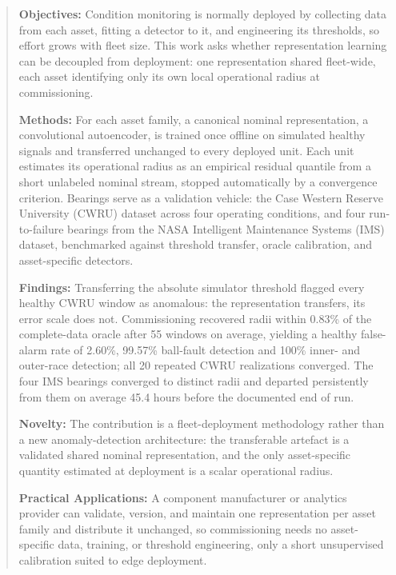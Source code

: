 \documentclass{trbunofficial}
\begin{document}
\begin{abstract}

\textbf{Objectives:} Condition monitoring is normally deployed by collecting
data from each asset, fitting a detector to it, and engineering its
thresholds, so effort grows with fleet size. This work asks whether
representation learning can be decoupled from deployment: one representation
shared fleet-wide, each asset identifying only its own local operational
radius at commissioning.

\textbf{Methods:} For each asset family, a canonical nominal representation,
a convolutional autoencoder, is trained once offline on simulated healthy
signals and transferred unchanged to every deployed unit. Each unit estimates
its operational radius as an empirical residual quantile from a short
unlabeled nominal stream, stopped automatically by a convergence criterion.
Bearings serve as a validation vehicle: the Case Western Reserve University
(CWRU) dataset across four operating conditions, and four run-to-failure
bearings from the NASA Intelligent Maintenance Systems (IMS) dataset,
benchmarked against threshold transfer, oracle calibration, and
asset-specific detectors.

\textbf{Findings:} Transferring the absolute simulator threshold flagged
every healthy CWRU window as anomalous: the representation transfers, its
error scale does not. Commissioning recovered radii within 0.83\% of the
complete-data oracle after 55 windows on average, yielding a healthy
false-alarm rate of 2.60\%, 99.57\% ball-fault detection and 100\% inner- and
outer-race detection; all 20 repeated CWRU realizations converged. The four
IMS bearings converged to distinct radii and departed persistently from them
on average 45.4 hours before the documented end of run.

\textbf{Novelty:} The contribution is a fleet-deployment methodology rather
than a new anomaly-detection architecture: the transferable artefact is a
validated shared nominal representation, and the only asset-specific quantity
estimated at deployment is a scalar operational radius.

\textbf{Practical Applications:} A component manufacturer or analytics
provider can validate, version, and maintain one representation per asset
family and distribute it unchanged, so commissioning needs no asset-specific
data, training, or threshold engineering, only a short unsupervised
calibration suited to edge deployment.

\end{abstract}
\end{document}
